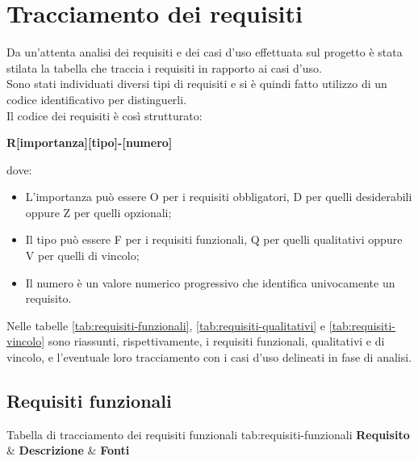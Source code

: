 \newpage









\section{Tracciamento dei requisiti}

Da un'attenta analisi dei requisiti e dei casi d'uso effettuata sul progetto è stata stilata la tabella che traccia i requisiti in rapporto ai casi d'uso.\\
Sono stati individuati diversi tipi di requisiti e si è quindi fatto utilizzo di un codice identificativo per distinguerli.\\
Il codice dei requisiti è così strutturato:
\begin{center}
    \textbf{R[importanza][tipo]-[numero]}
\end{center}
dove:
\begin{itemize}
	\item L'importanza può essere O per i requisiti obbligatori, D per quelli desiderabili oppure Z per quelli opzionali;
	\item Il tipo può essere F per i requisiti funzionali, Q per quelli qualitativi oppure V per quelli di vincolo;
	\item Il numero è un valore numerico progressivo che identifica univocamente un requisito.
\end{itemize}
Nelle tabelle \ref{tab:requisiti-funzionali}, \ref{tab:requisiti-qualitativi} e \ref{tab:requisiti-vincolo} sono riassunti, rispettivamente, i requisiti funzionali, qualitativi e di vincolo, e l’eventuale loro tracciamento con i casi d'uso delineati in fase di analisi.


\subsection{Requisiti funzionali}

\RequisitiTable
  {Tabella di tracciamento dei requisiti funzionali}
  {tab:requisiti-funzionali}
  {\textbf{Requisito} & \textbf{Descrizione} & \textbf{Fonti}}

